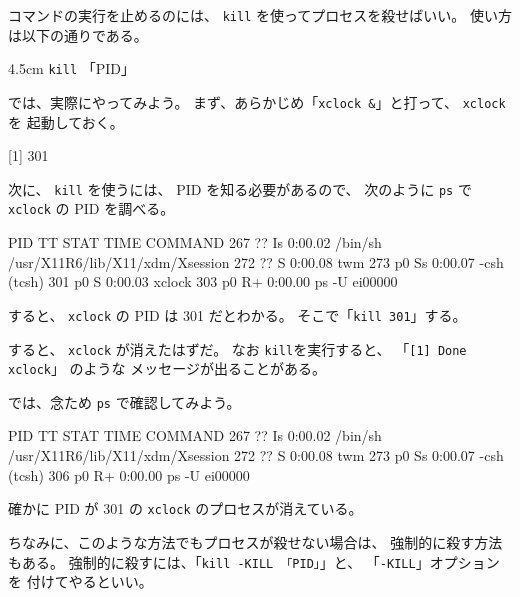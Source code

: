 コマンドの実行を止めるのには、 \texttt{kill} を使ってプロセスを殺せばいい。
使い方は以下の通りである。

\begin{coml}{4.5cm}
\texttt{kill} 「PID」
\end{coml}

では、実際にやってみよう。
まず、あらかじめ「\texttt{xclock \&}」と打って、 \texttt{xclock} を
起動しておく。
\begin{progls}
[1] 301
%
\end{progls}

\newpage

次に、 \texttt{kill} を使うには、 PID を知る必要があるので、
次のように \texttt{ps} で \texttt{xclock} の PID を調べる。

\begin{progls}
  PID  TT  STAT      TIME COMMAND
  267  ??  Is     0:00.02 /bin/sh /usr/X11R6/lib/X11/xdm/Xsession
  272  ??  S      0:00.08 twm
  273  p0  Ss     0:00.07 -csh (tcsh)
  301  p0  S      0:00.03 xclock
  303  p0  R+     0:00.00 ps -U ei00000
%
\end{progls}

すると、 \texttt{xclock} の PID は 301 だとわかる。
そこで「\texttt{kill 301}」する。

\begin{progls}
%
\end{progls}

すると、 \texttt{xclock} が消えたはずだ。
なお \texttt{kill}を実行すると、
「\texttt{[1]    Done                          xclock}」
のような
メッセージが出ることがある。

では、念ため \texttt{ps} で確認してみよう。

\begin{progls}
  PID  TT  STAT      TIME COMMAND
  267  ??  Is     0:00.02 /bin/sh /usr/X11R6/lib/X11/xdm/Xsession
  272  ??  S      0:00.08 twm
  273  p0  Ss     0:00.07 -csh (tcsh)
  306  p0  R+     0:00.00 ps -U ei00000
\end{progls}

確かに PID が 301 の \texttt{xclock} のプロセスが消えている。

ちなみに、このような方法でもプロセスが殺せない場合は、
強制的に殺す方法もある。
強制的に殺すには、「\texttt{kill -KILL 「PID」}」と、
「\texttt{-KILL}」オプションを
付けてやるといい。

\vspace*{6mm}

